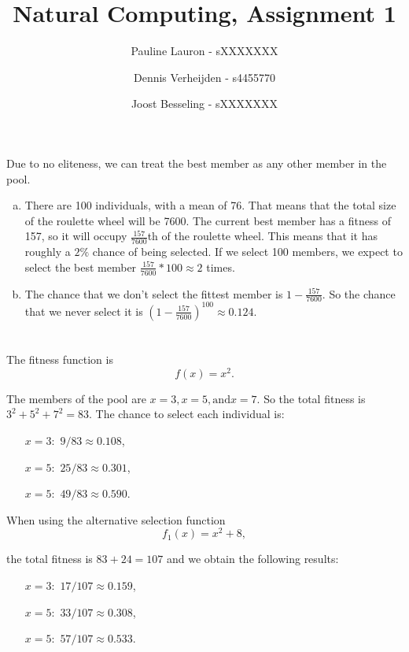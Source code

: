 \documentclass[11pt]{article}
\title{Natural Computing, Assignment 1}
\author{Pauline Lauron - sXXXXXXX \and Dennis Verheijden - s4455770 \and Joost Besseling - sXXXXXXX}
\begin{document}
	\maketitle
	
	\section{}
	Due to no eliteness, we can treat the best member as any other member in the pool.
	
	\begin{enumerate}[(a)]
		\item There are 100 individuals, with a mean of 76. That means that the total size of the roulette wheel will be 7600. The current best member has a fitness of 157, so it will occupy $\frac{157}{7600}$th of the roulette wheel. This means that it has roughly a $2\%$ chance of being selected. If we select 100 members, we expect to select the best member $\frac{157}{7600} * 100 \approx 2 $ times.
		
		\item The chance that we don't select the fittest member is $1 - \frac{157}{7600}$. So the chance that we never select it is $\left(1 - \frac{157}{7600}\right)^{100} \approx 0.124$.
	\end{enumerate}

	\section{}
	
	The fitness function is \[ f(x) = x^2. \]
	
	The members of the pool are $x=3, x=5, \text{and} x=7$. So the total fitness is $3^2 + 5^2 + 7^2 = 83$. The chance to select each individual is: 
	\begin{itemize}
		\item[$x=3:$] $9/83 \approx 0.108$,
		
		\item[$x=5:$] $25/83 \approx 0.301$,
		
		\item[$x=5:$] $49/83 \approx 0.590$.
		 
	\end{itemize}

	When using the alternative selection function 
	\[
		f_1(x) = x^2 + 8,
	\] 
	
	the total fitness is $83 + 24 = 107$ and
	we obtain the following results: 
	
		\begin{itemize}
		\item[$x=3:$] $17/107 \approx 0.159$,
		
		\item[$x=5:$] $33/107 \approx 0.308$,
		
		\item[$x=5:$] $57/107 \approx 0.533$.
		
	\end{itemize}
\end{document}
